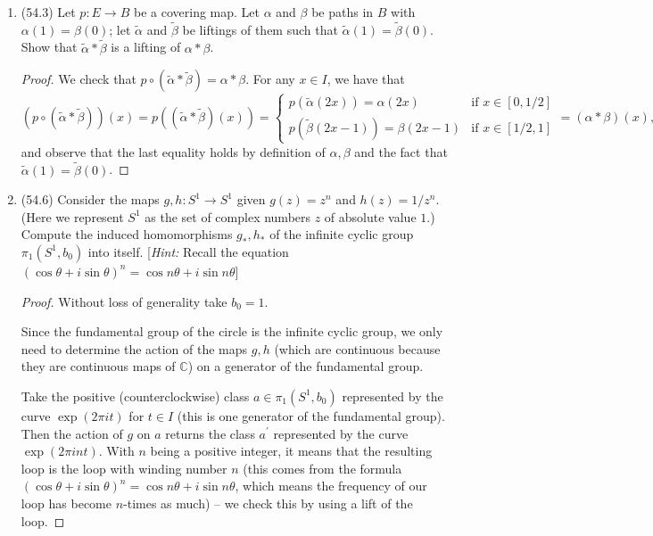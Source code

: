 \documentclass[11pt]{article}
\begin{document}
\begin{enumerate}
    \item (54.3) Let $p\colon E\to B$ be a covering map. Let $\alpha$ and $\beta$ be paths in $B$ with $\alpha(1) = \beta(0)$; let $\tilde{\alpha}$ and $\tilde{\beta}$ be liftings of them such that $\tilde{\alpha}(1) = \tilde{\beta}(0)$. Show that $\tilde{\alpha}\ast \tilde{\beta}$ is a lifting of $\alpha\ast\beta$.
    \begin{proof}
      We check that $p\circ (\tilde{\alpha}\ast\tilde{\beta}) = \alpha\ast\beta$. For any $x\in I$, we have that \[(p\circ (\tilde{\alpha}\ast\tilde{\beta}))(x) = p((\tilde{\alpha}\ast\tilde{\beta})(x)) = \begin{cases}
        p(\tilde{\alpha}(2x)) = \alpha(2x) & \text{if $x\in [0,1/2]$}\\
        p(\tilde{\beta}(2x-1)) = \beta(2x-1) & \text{if $x\in [1/2,1]$}
      \end{cases} = (\alpha\ast\beta)(x),\] and observe that the last equality holds by definition of $\alpha,\beta$ and the fact that $\tilde{\alpha}(1) = \tilde{\beta}(0)$.
    \end{proof}
    \item (54.6) Consider the maps $g,h\colon S^1\to S^1$ given $g(z) = z^n$ and $h(z) = 1/z^n$. (Here we represent $S^1$ as the set of complex numbers $z$ of absolute value $1$.) Compute the induced homomorphisms $g_\ast, h_\ast$ of the infinite cyclic group $\pi_1(S^1,b_0)$ into itself. [\textit{Hint:} Recall the equation $(\cos\theta + i\sin\theta)^n = \cos n\theta + i\sin n\theta$]
    \begin{proof} Without loss of generality take $b_0 = 1$.


      Since the fundamental group of the circle is the infinite cyclic group, we only need to determine the action of the maps $g,h$ (which are continuous because they are continuous maps of $\mathbb{C}$) on a generator of the fundamental group.
      
      Take the positive (counterclockwise) class $a\in \pi_1(S^1,b_0)$ represented by the curve $\exp(2\pi i t)$ for $t\in I$ (this is one generator of the fundamental group). Then the action of $g$ on $a$ returns the class $a^{\prime}$ represented by the curve $\exp(2\pi i nt)$. With $n$ being a positive integer, it means that the resulting loop is the loop with winding number $n$ (this comes from the formula $(\cos\theta + i\sin\theta)^n = \cos n\theta + i\sin n\theta$, which means the frequency of our loop has become $n$-times as much) -- we check this by using a lift of the loop. 
      

\end{proof}
\end{enumerate}
\end{document}
